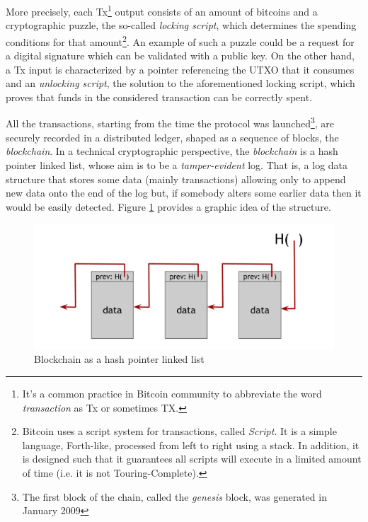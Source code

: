 \bigskip
\noindent
More precisely, each Tx\footnote{It's a common practice in Bitcoin community to abbreviate the word \textit{transaction} as Tx or sometimes TX.} output consists of an amount of bitcoins and a cryptographic puzzle, the so-called \textit{locking script}, which determines the spending conditions for that amount\footnote{Bitcoin uses a script system for transactions, called \textit{Script}. It is a simple language, Forth-like, processed from left to right using a stack. In addition, it is designed such that it guarantees all scripts will execute in a limited amount of time (i.e. it is not Touring-Complete).}. An example of such a puzzle could be a request for a digital signature which can be validated with a public key. On the other hand, a Tx input is characterized by a pointer referencing the UTXO that it consumes and an \textit{unlocking script}, the solution to the aforementioned locking script, which proves that funds in the considered transaction can be correctly spent.

\bigskip
\noindent
All the transactions, starting from the time the protocol was launched\footnote{The first block of the chain, called the \textit{genesis} block, was generated in January 2009}, are securely recorded in a distributed ledger, shaped as a sequence of blocks, the \textit{blockchain}. In a technical cryptographic perspective, the \textit{blockchain} is a hash pointer linked list, whose aim is to be a \textit{tamper-evident} log. That is, a log data structure that stores some data (mainly transactions) allowing only to append new data onto the end of the log but, if somebody alters some earlier data then it would be easily detected. Figure \ref{fig:blockchain} provides a graphic idea of the structure.

\begin{figure}[!htbp]
    \centering
    \includegraphics[width=0.9\linewidth]{Images/blockchain.png}
    \caption{Blockchain as a hash pointer linked list}
    \label{fig:blockchain}
\end{figure}

